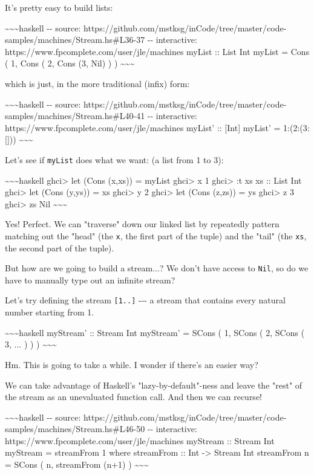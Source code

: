 \documentclass[]{article}
\begin{document}
It's pretty easy to build lists:

\textasciitilde{}\textasciitilde{}\textasciitilde{}haskell -\/- source:
https://github.com/mstksg/inCode/tree/master/code-samples/machines/Stream.hs\#L36-37
-\/- interactive: https://www.fpcomplete.com/user/jle/machines myList :: List
Int myList = Cons ( 1, Cons ( 2, Cons (3, Nil) ) )
\textasciitilde{}\textasciitilde{}\textasciitilde{}

which is just, in the more traditional (infix) form:

\textasciitilde{}\textasciitilde{}\textasciitilde{}haskell -\/- source:
https://github.com/mstksg/inCode/tree/master/code-samples/machines/Stream.hs\#L40-41
-\/- interactive: https://www.fpcomplete.com/user/jle/machines myList' ::
{[}Int{]} myList' = 1:(2:(3:{[}{]}))
\textasciitilde{}\textasciitilde{}\textasciitilde{}

Let's see if \texttt{myList} does what we want: (a list from 1 to 3):

\textasciitilde{}\textasciitilde{}\textasciitilde{}haskell ghci\textgreater{}
let (Cons (x,xs)) = myList ghci\textgreater{} x 1 ghci\textgreater{} :t xs xs ::
List Int ghci\textgreater{} let (Cons (y,ys)) = xs ghci\textgreater{} y 2
ghci\textgreater{} let (Cons (z,zs)) = ys ghci\textgreater{} z 3
ghci\textgreater{} zs Nil \textasciitilde{}\textasciitilde{}\textasciitilde{}

Yes! Perfect. We can "traverse" down our linked list by repeatedly pattern
matching out the "head" (the \texttt{x}, the first part of the tuple) and the
"tail" (the \texttt{xs}, the second part of the tuple).

But how are we going to build a stream...? We don't have access to \texttt{Nil},
so do we have to manually type out an infinite stream?

Let's try defining the stream \texttt{{[}1..{]}} -\/-\/- a stream that contains
every natural number starting from 1.

\textasciitilde{}\textasciitilde{}\textasciitilde{}haskell myStream' :: Stream
Int myStream' = SCons ( 1, SCons ( 2, SCons ( 3, ... ) ) )
\textasciitilde{}\textasciitilde{}\textasciitilde{}

Hm. This is going to take a while. I wonder if there's an easier way?

We can take advantage of Haskell's "lazy-by-default"-ness and leave the "rest"
of the stream as an unevaluated function call. And then we can recurse!

\textasciitilde{}\textasciitilde{}\textasciitilde{}haskell -\/- source:
https://github.com/mstksg/inCode/tree/master/code-samples/machines/Stream.hs\#L46-50
-\/- interactive: https://www.fpcomplete.com/user/jle/machines myStream ::
Stream Int myStream = streamFrom 1 where streamFrom :: Int -\textgreater{}
Stream Int streamFrom n = SCons ( n, streamFrom (n+1) )
\textasciitilde{}\textasciitilde{}\textasciitilde{}
\end{document}
